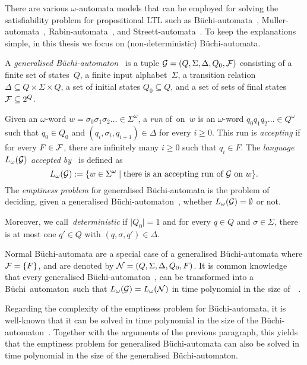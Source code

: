 There are various $\omega$-automata models that can be employed for solving the
satisfiability problem for propositional LTL such as
Büchi-automata~\cite{Bue-ICLMPS62}, Muller-automata~\cite{Mul-SWCT63},
Rabin-automata~\cite{Rab-ToAMS69}, and Streett-automata~\cite{Str-IC82}.  To
keep the explanations simple, in this thesis we focus on (non-deterministic)
Büchi-automata.

\begin{definition}\label{def:gnba}
    A \emph{generalised Büchi-automaton~\Gmc} is a tuple
    $\mathcal{G}=(Q,\Sigma,\Delta,Q_0,\mathcal{F})$ consisting of a finite set of states~$Q$,
    a finite input alphabet~$\Sigma$, a transition relation
    $\Delta\subseteq Q\times\Sigma\times Q$, a set of initial states
    $Q_0\subseteq Q$, and a set of sets of final states $\mathcal{F}\subseteq 2^Q$.

    Given an $\omega$-word $w=\sigma_0\sigma_1\sigma_2\dotso\in\Sigma^\omega$, a
    \emph{run} of~\Gmc on~$w$ is an $\omega$-word $q_0q_1q_2\dotso\in Q^\omega$
    such that $q_0\in Q_0$ and $(q_i,\sigma_i,q_{i+1})\in\Delta$ for every
    $i\ge 0$.  This run is \emph{accepting} if for every $F\in\mathcal{F}$, there are
    infinitely many $i\ge 0$ such that $q_i\in F$.
    The \emph{language $L_\omega(\mathcal{G})$ accepted by~\Gmc} is defined as
    \[L_\omega(\Gmc):=\{w\in\Sigma^\omega\mid\text{there is an accepting run of \Gmc on $w$}\}.\]
    The \emph{emptiness problem} for generalised Büchi-automata is the problem
    of deciding, given a generalised Büchi-automaton~\Gmc, whether
    $L_\omega(\mathcal{G})=\emptyset$ or not.

    Moreover, we call~\Gmc \emph{deterministic} if $\lvert Q_0\rvert=1$ and for
    every $q\in Q$ and $\sigma\in\Sigma$, there is at most one $q'\in Q$ with
    $(q,\sigma,q')\in\Delta$.
\end{definition}

\noindent
Normal Büchi-automata are a special case of a generalised Büchi-automata where
$\mathcal{F}=\{F\}$, and are denoted by $\mathcal{N}=(Q,\Sigma,\Delta,Q_0,F)$.
%
It is common knowledge that every generalised Büchi-automaton~\Gmc, can be
transformed into a Büchi~automaton~\Nmc such that
$L_\omega(\mathcal{G})=L_\omega(\mathcal{N})$ in time polynomial in the size
of~\Gmc~\cite{GPV+-PSTV96,BaKa-08}.

Regarding the complexity of the emptiness problem for Büchi-automata, it is
well-known that it can be solved in time polynomial in the size of the
Büchi-automaton~\cite{VaWo-IC94}.  Together with the arguments of the previous
paragraph, this yields that the emptiness problem for generalised Büchi-automata
can also be solved in time polynomial in the size of the generalised
Büchi-automaton.

